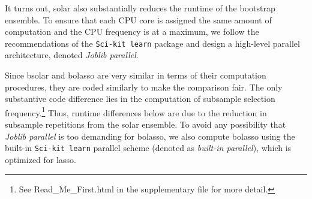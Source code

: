 \documentclass[12pt]{article}
\begin{document}
It turns out, solar also substantially reduces the runtime of the bootstrap ensemble. To ensure that each CPU core is assigned the same amount of computation and the CPU frequency is at a maximum, we follow the recommendations of the \texttt{Sci-kit learn} package and design a high-level parallel architecture, denoted \emph{Joblib parallel}.

\begin{table}[h]
  \centering
  \caption{Average runtime (seconds) for solar, bsolar, and bolasso over 30 repetitions.\label{table:sim_3_comp}}
\end{table}

Since bsolar and bolasso are very similar in terms of their computation procedures, they are coded similarly to make the comparison fair. The only substantive code difference lies in the computation of subsample selection frequency.\footnote{See Read\_Me\_First.html in the supplementary file for more detail.} Thus, runtime differences below are due to the reduction in subsample repetitions from the solar ensemble. To avoid any possibility that \emph{Joblib parallel} is too demanding for bolasso, we also compute bolasso using the built-in \texttt{Sci-kit learn} parallel scheme (denoted as \emph{built-in parallel}), which is optimized for lasso.
\end{document}
